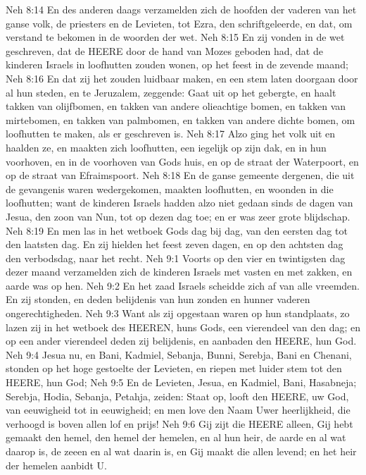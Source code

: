 Neh 8:14  En des anderen daags verzamelden zich de hoofden der vaderen van het ganse volk, de priesters en de Levieten, tot Ezra, den schriftgeleerde, en dat, om verstand te bekomen in de woorden der wet.
Neh 8:15  En zij vonden in de wet geschreven, dat de HEERE door de hand van Mozes geboden had, dat de kinderen Israels in loofhutten zouden wonen, op het feest in de zevende maand;
Neh 8:16  En dat zij het zouden luidbaar maken, en een stem laten doorgaan door al hun steden, en te Jeruzalem, zeggende: Gaat uit op het gebergte, en haalt takken van olijfbomen, en takken van andere olieachtige bomen, en takken van mirtebomen, en takken van palmbomen, en takken van andere dichte bomen, om loofhutten te maken, als er geschreven is.
Neh 8:17  Alzo ging het volk uit en haalden ze, en maakten zich loofhutten, een iegelijk op zijn dak, en in hun voorhoven, en in de voorhoven van Gods huis, en op de straat der Waterpoort, en op de straat van Efraimspoort.
Neh 8:18  En de ganse gemeente dergenen, die uit de gevangenis waren wedergekomen, maakten loofhutten, en woonden in die loofhutten; want de kinderen Israels hadden alzo niet gedaan sinds de dagen van Jesua, den zoon van Nun, tot op dezen dag toe; en er was zeer grote blijdschap.
Neh 8:19  En men las in het wetboek Gods dag bij dag, van den eersten dag tot den laatsten dag. En zij hielden het feest zeven dagen, en op den achtsten dag den verbodsdag, naar het recht.
Neh 9:1  Voorts op den vier en twintigsten dag dezer maand verzamelden zich de kinderen Israels met vasten en met zakken, en aarde was op hen.
Neh 9:2  En het zaad Israels scheidde zich af van alle vreemden. En zij stonden, en deden belijdenis van hun zonden en hunner vaderen ongerechtigheden.
Neh 9:3  Want als zij opgestaan waren op hun standplaats, zo lazen zij in het wetboek des HEEREN, huns Gods, een vierendeel van den dag; en op een ander vierendeel deden zij belijdenis, en aanbaden den HEERE, hun God.
Neh 9:4  Jesua nu, en Bani, Kadmiel, Sebanja, Bunni, Serebja, Bani en Chenani, stonden op het hoge gestoelte der Levieten, en riepen met luider stem tot den HEERE, hun God;
Neh 9:5  En de Levieten, Jesua, en Kadmiel, Bani, Hasabneja; Serebja, Hodia, Sebanja, Petahja, zeiden: Staat op, looft den HEERE, uw God, van eeuwigheid tot in eeuwigheid; en men love den Naam Uwer heerlijkheid, die verhoogd is boven allen lof en prijs!
Neh 9:6  Gij zijt die HEERE alleen, Gij hebt gemaakt den hemel, den hemel der hemelen, en al hun heir, de aarde en al wat daarop is, de zeeen en al wat daarin is, en Gij maakt die allen levend; en het heir der hemelen aanbidt U.
